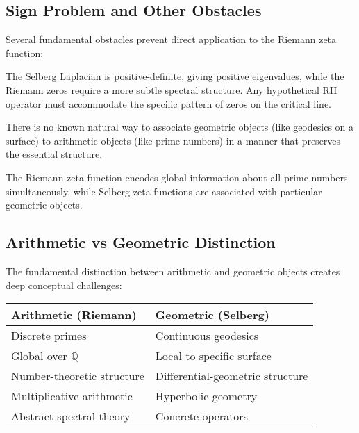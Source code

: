 \subsection{Sign Problem and Other Obstacles}

Several fundamental obstacles prevent direct application to the Riemann zeta function:

\begin{problem}
\label{prob:sign_problem}
The Selberg Laplacian is positive-definite, giving positive eigenvalues, while the Riemann zeros require a more subtle spectral structure. Any hypothetical RH operator must accommodate the specific pattern of zeros on the critical line.
\end{problem}

\begin{problem}
\label{prob:arithmetic_geometric}
There is no known natural way to associate geometric objects (like geodesics on a surface) to arithmetic objects (like prime numbers) in a manner that preserves the essential structure.
\end{problem}

\begin{problem}
\label{prob:global_local}
The Riemann zeta function encodes global information about all prime numbers simultaneously, while Selberg zeta functions are associated with particular geometric objects.
\end{problem}

\subsection{Arithmetic vs Geometric Distinction}

The fundamental distinction between arithmetic and geometric objects creates deep conceptual challenges:

\begin{center}
\begin{tabular}{|l|l|}
\hline
\textbf{Arithmetic (Riemann)} & \textbf{Geometric (Selberg)} \\
\hline
Discrete primes & Continuous geodesics \\
Global over $\mathbb{Q}$ & Local to specific surface \\
Number-theoretic structure & Differential-geometric structure \\
Multiplicative arithmetic & Hyperbolic geometry \\
Abstract spectral theory & Concrete operators \\
\hline
\end{tabular}
\end{center}

